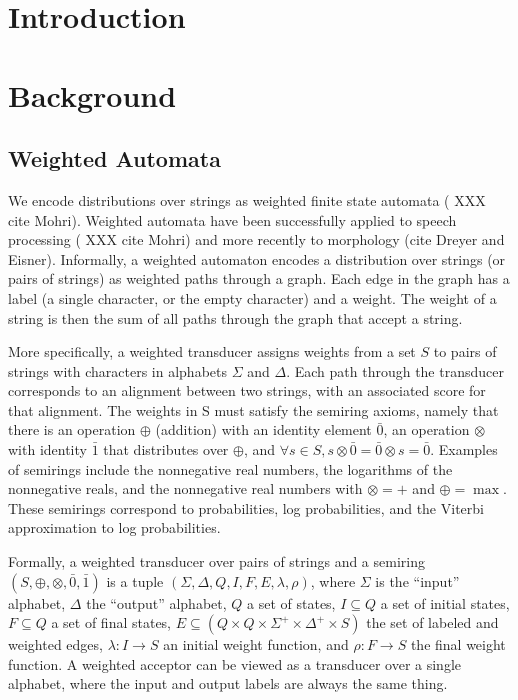 \documentclass[11pt]{article}
\title{}
\author{}
\date{}
\begin{document}
\maketitle
\begin{abstract}
\end{abstract}
\section{Introduction}
\section{Background}
\subsection{Weighted Automata}

We encode distributions over strings as weighted finite state
automata ( XXX cite Mohri). Weighted automata have been successfully
applied to speech processing ( XXX cite Mohri) and more recently
to morphology (cite Dreyer and Eisner). Informally, a weighted
automaton encodes a distribution over strings (or pairs of strings)
as weighted paths through a graph. Each edge in the graph has a
label (a single character, or the empty character) and a weight.
The weight of a string is then the sum of all paths through the
graph that accept a string.

More specifically, a weighted transducer assigns weights from a set
$S$ to pairs of strings with characters in alphabets $\Sigma$ and
$\Delta$. Each path through the transducer corresponds to an alignment
between two strings, with an associated score for that alignment.
The weights in S must satisfy the semiring axioms, namely that there
is an operation $\oplus$ (addition) with an identity element $\bar
0$, an operation $\otimes$ with identity $\bar 1$ that distributes
over $\oplus$, and $\forall s\in S, s\otimes \bar 0 = \bar 0 \otimes
s = \bar 0$. Examples of semirings include the nonnegative real
numbers, the logarithms of the nonnegative reals, and the nonnegative
real numbers with $\otimes = +$ and $\oplus = \max$. These semirings
correspond to probabilities, log probabilities, and the Viterbi
approximation to log probabilities.

Formally, a weighted transducer over pairs of strings and a semiring
$(S,\oplus,\otimes,\bar 0, \bar 1)$ is a tuple
$(\Sigma,\Delta,Q,I,F,E,\lambda,\rho)$, where $\Sigma$ is the
``input'' alphabet, $\Delta$ the ``output'' alphabet, $Q$ a set of
states, $I \subseteq Q$ a set of initial states, $F \subseteq Q$ a
set of final states, $E \subseteq (Q \times Q \times \Sigma^+ \times
\Delta^+ \times S)$ the set of labeled and weighted edges, $\lambda:
I \rightarrow S$ an initial weight function, and $\rho: F \rightarrow
S$ the final weight function. A weighted acceptor can be viewed as
a transducer over a single alphabet, where the input and output
labels are always the same thing.
\end{document}
